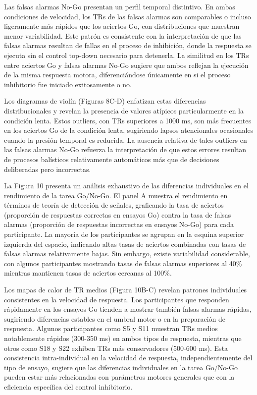 \documentclass[
  spanish,
  10pt,
]{article}
\begin{document}
Las falsas alarmas No-Go presentan un perfil temporal distintivo. En
ambas condiciones de velocidad, los TRs de las falsas alarmas son
comparables o incluso ligeramente más rápidos que los aciertos Go, con
distribuciones que muestran menor variabilidad. Este patrón es
consistente con la interpretación de que las falsas alarmas resultan de
fallas en el proceso de inhibición, donde la respuesta se ejecuta sin el
control top-down necesario para detenerla. La similitud en los TRs entre
aciertos Go y falsas alarmas No-Go sugiere que ambos reflejan la
ejecución de la misma respuesta motora, diferenciándose únicamente en si
el proceso inhibitorio fue iniciado exitosamente o no.

Los diagramas de violín (Figuras 8C-D) enfatizan estas diferencias
distribucionales y revelan la presencia de valores atípicos
particularmente en la condición lenta. Estos outliers, con TRs
superiores a 1000 ms, son más frecuentes en los aciertos Go de la
condición lenta, sugiriendo lapsos atencionales ocasionales cuando la
presión temporal es reducida. La ausencia relativa de tales outliers en
las falsas alarmas No-Go refuerza la interpretación de que estos errores
resultan de procesos balísticos relativamente automáticos más que de
decisiones deliberadas pero incorrectas.

La Figura 10 presenta un análisis exhaustivo de las diferencias
individuales en el rendimiento de la tarea Go/No-Go. El panel A muestra
el rendimiento en términos de teoría de detección de señales, graficando
la tasa de aciertos (proporción de respuestas correctas en ensayos Go)
contra la tasa de falsas alarmas (proporción de respuestas incorrectas
en ensayos No-Go) para cada participante. La mayoría de los
participantes se agrupan en la esquina superior izquierda del espacio,
indicando altas tasas de aciertos combinadas con tasas de falsas alarmas
relativamente bajas. Sin embargo, existe variabilidad considerable, con
algunos participantes mostrando tasas de falsas alarmas superiores al
40\% mientras mantienen tasas de aciertos cercanas al 100\%.

Los mapas de calor de TR medios (Figura 10B-C) revelan patrones
individuales consistentes en la velocidad de respuesta. Los
participantes que responden rápidamente en los ensayos Go tienden a
mostrar también falsas alarmas rápidas, sugiriendo diferencias estables
en el umbral motor o en la preparación de respuesta. Algunos
participantes como S5 y S11 muestran TRs medios notablemente rápidos
(300-350 ms) en ambos tipos de respuesta, mientras que otros como S18 y
S22 exhiben TRs más conservadores (500-600 ms). Esta consistencia
intra-individual en la velocidad de respuesta, independientemente del
tipo de ensayo, sugiere que las diferencias individuales en la tarea
Go/No-Go pueden estar más relacionadas con parámetros motores generales
que con la eficiencia específica del control inhibitorio.
\end{document}
